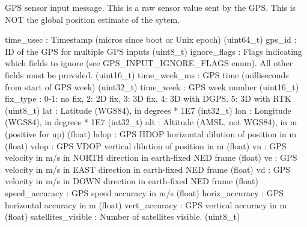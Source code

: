 \begin{DoxyVerb}
\begin{DoxyVerb}
\begin{DoxyVerb}GPS sensor input message.  This is a raw sensor value sent by the GPS.
This is NOT the global position estimate of the sytem.

time_usec                 : Timestamp (micros since boot or Unix epoch) (uint64_t)
gps_id                    : ID of the GPS for multiple GPS inputs (uint8_t)
ignore_flags              : Flags indicating which fields to ignore (see GPS_INPUT_IGNORE_FLAGS enum).  All other fields must be provided. (uint16_t)
time_week_ms              : GPS time (milliseconds from start of GPS week) (uint32_t)
time_week                 : GPS week number (uint16_t)
fix_type                  : 0-1: no fix, 2: 2D fix, 3: 3D fix. 4: 3D with DGPS. 5: 3D with RTK (uint8_t)
lat                       : Latitude (WGS84), in degrees * 1E7 (int32_t)
lon                       : Longitude (WGS84), in degrees * 1E7 (int32_t)
alt                       : Altitude (AMSL, not WGS84), in m (positive for up) (float)
hdop                      : GPS HDOP horizontal dilution of position in m (float)
vdop                      : GPS VDOP vertical dilution of position in m (float)
vn                        : GPS velocity in m/s in NORTH direction in earth-fixed NED frame (float)
ve                        : GPS velocity in m/s in EAST direction in earth-fixed NED frame (float)
vd                        : GPS velocity in m/s in DOWN direction in earth-fixed NED frame (float)
speed_accuracy            : GPS speed accuracy in m/s (float)
horiz_accuracy            : GPS horizontal accuracy in m (float)
vert_accuracy             : GPS vertical accuracy in m (float)
satellites_visible        : Number of satellites visible. (uint8_t)\end{DoxyVerb}
 \mbox{\label{classpymavlink_1_1dialects_1_1v10_1_1MAVLink_ad4ccec5cb80f27a2318f4860d976624d}} 

\end{DoxyVerb}
\end{DoxyVerb}
